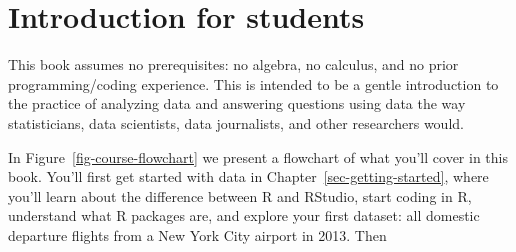 \documentclass[
  letterpaper,
  DIV=11,
  numbers=noendperiod]{scrreprt}
\theoremstyle{definition}
\theoremstyle{remark}
\begin{document}
\hypertarget{introduction-for-students}{%
\section*{Introduction for students}\label{introduction-for-students}}

This book assumes no prerequisites: no algebra, no calculus, and no
prior programming/coding experience. This is intended to be a gentle
introduction to the practice of analyzing data and answering questions
using data the way statisticians, data scientists, data journalists, and
other researchers would.

In Figure~\ref{fig-course-flowchart} we present a flowchart of what
you'll cover in this book. You'll first get started with data in
Chapter~\ref{sec-getting-started}, where you'll learn about the
difference between R and RStudio, start coding in R, understand what R
packages are, and explore your first dataset: all domestic departure
flights from a New York City airport in 2013. Then
\end{document}
